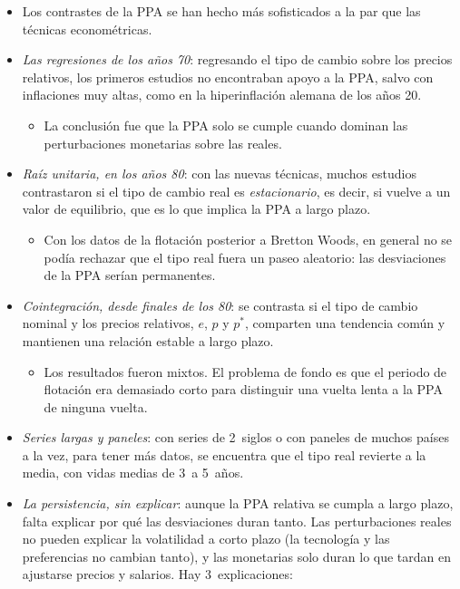 \documentclass[11pt]{article}
\begin{document}
\begin{itemize}
\item Los contrastes de la PPA se han hecho más sofisticados a la par que las técnicas econométricas\nocite{TaylorTaylor2004PPP,SarnoTaylor2002Economics}.
\item \emph{Las regresiones de los años 70}: regresando el tipo de cambio sobre los precios relativos, los primeros estudios no encontraban apoyo a la PPA, salvo con inflaciones muy altas, como en la hiperinflación alemana de los años 20\nocite{Frenkel1976Monetary,Frenkel1978PPP}.
  \begin{itemize}
  \item La conclusión fue que la PPA solo se cumple cuando dominan las perturbaciones monetarias sobre las reales.
  \end{itemize}
\item \emph{Raíz unitaria, en los años 80}: con las nuevas técnicas, muchos estudios contrastaron si el tipo de cambio real es \emph{estacionario}, es decir, si vuelve a un valor de equilibrio, que es lo que implica la PPA a largo plazo.
  \begin{itemize}
  \item Con los datos de la flotación posterior a Bretton Woods, en general no se podía rechazar que el tipo real fuera un paseo aleatorio: las desviaciones de la PPA serían permanentes.
  \end{itemize}
\item \emph{Cointegración, desde finales de los 80}: se contrasta si el tipo de cambio nominal y los precios relativos, $e$, $p$ y $p^*$, comparten una tendencia común y mantienen una relación estable a largo plazo.
  \begin{itemize}
  \item Los resultados fueron mixtos. El problema de fondo es que el periodo de flotación era demasiado corto para distinguir una vuelta lenta a la PPA de ninguna vuelta.
  \end{itemize}
\item \emph{Series largas y paneles}: con series de 2~siglos\nocite{LothianTaylor1996Real} o con paneles de muchos países a la vez, para tener más datos, se encuentra que el tipo real revierte a la media, con vidas medias de 3~a 5~años\nocite{Rogoff1996PPA}.
\item \emph{La persistencia, sin explicar}: aunque la PPA relativa se cumpla a largo plazo, falta explicar por qué las desviaciones duran tanto. Las perturbaciones reales no pueden explicar la volatilidad a corto plazo (la tecnología y las preferencias no cambian tanto), y las monetarias solo duran lo que tardan en ajustarse precios y salarios. Hay 3~explicaciones:

\end{itemize}
\end{document}
